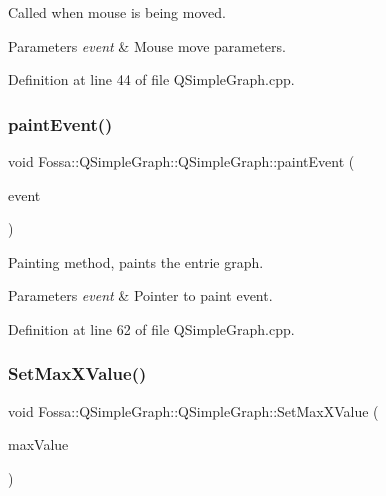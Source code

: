 Called when mouse is being moved. 


\begin{DoxyParams}{Parameters}
{\em event} & Mouse move parameters. \\
\hline
\end{DoxyParams}


Definition at line 44 of file Q\+Simple\+Graph.\+cpp.

\mbox{\label{class_fossa_1_1_q_simple_graph_1_1_q_simple_graph_a6559739099820e1303c1dbe2c5757bc4}} 
\subsubsection{\texorpdfstring{paint\+Event()}{paintEvent()}}
{\footnotesize\ttfamily void Fossa\+::\+Q\+Simple\+Graph\+::\+Q\+Simple\+Graph\+::paint\+Event (\begin{DoxyParamCaption}\item[{Q\+Paint\+Event $\ast$}]{event }\end{DoxyParamCaption})\hspace{0.3cm}{\ttfamily [protected]}}



Painting method, paints the entrie graph. 


\begin{DoxyParams}{Parameters}
{\em event} & Pointer to paint event. \\
\hline
\end{DoxyParams}


Definition at line 62 of file Q\+Simple\+Graph.\+cpp.

\mbox{\label{class_fossa_1_1_q_simple_graph_1_1_q_simple_graph_a568a2dea4e0307b6888aaa048b4da97a}} 
\subsubsection{\texorpdfstring{Set\+Max\+X\+Value()}{SetMaxXValue()}}
{\footnotesize\ttfamily void Fossa\+::\+Q\+Simple\+Graph\+::\+Q\+Simple\+Graph\+::\+Set\+Max\+X\+Value (\begin{DoxyParamCaption}\item[{double}]{max\+Value }\end{DoxyParamCaption})\hspace{0.3cm}{\ttfamily [virtual]}}



